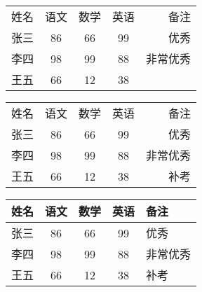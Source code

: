 \documentclass{article}
\begin{document}
    \begin{tabular}{l c c c r}
        姓名 & 语文 & 数学 & 英语 & 备注 \\
        张三 & 86 & 66 & 99 & 优秀 \\
        李四 & 98 & 99 & 88 & 非常优秀 \\
        王五 & 66 & 12 & 38 & \\
    \end{tabular}


    \begin{tabular}{l | c | c | c | r}
        姓名 & 语文 & 数学 & 英语 & 备注 \\
        张三 & 86 & 66 & 99 & 优秀 \\
        李四 & 98 & 99 & 88 & 非常优秀 \\
        王五 & 66 & 12 & 38 & 补考 \\
    \end{tabular}

    \begin{tabular}{l || c | c | c | p{1.5cm}}
        \hline \hline
        姓名 & 语文 & 数学 & 英语 & 备注 \\
        \hline
        张三 & 86 & 66 & 99 & 优秀 \\
        \hline
        李四 & 98 & 99 & 88 & 非常优秀 \\
        \hline
        王五 & 66 & 12 & 38 & 补考 \\
        \hline
    \end{tabular}

\end{document}
